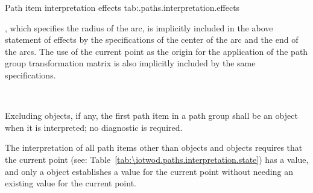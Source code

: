 \begin{libreqtab2a} {Path item interpretation effects} {tab:\iotwod.paths.interpretation.effects}
\begin{note} , which specifies the radius of the arc, is implicitly included in the above statement of effects by the specifications of the center of the arc and the end of the arcs. The use of the current point as the origin for the application of the path group transformation matrix is also implicitly included by the same specifications. \end{note} \\
\end{libreqtab2a}

\pnum
Excluding  objects, if any, the first path item in a path group shall be an  object when it is interpreted; no diagnostic is required.

\pnum
\begin{note}
The interpretation of all path items other than  objects and  objects requires that the current point (see: Table~\ref{tab:\iotwod.paths.interpretation.state}) has a value, and only a  object establishes a value for the current point without needing an existing value for the current point.
\end{note}
